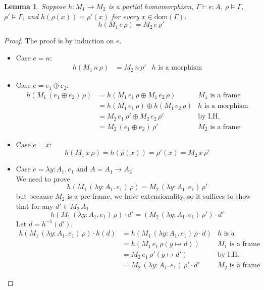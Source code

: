 \documentclass{tufte-handout}
\newcommand{\LAM}[1]{\lambda #1.\,}
\newcommand{\of}[0]{\!:\!}
\newcommand{\ext}[3]{#3(#1{\mapsto}#2)}
\newtheorem{lemma}[theorem]{Lemma}
\begin{document}
\begin{lemma}
\label{lem:homo-equal}
  Suppose $h : M_1 \to M_2$ is a partial homomorphism, $\Gamma \vdash
  e : A$, $\rho \models \Gamma$, $\rho' \models \Gamma$, and
  $h(\rho(x)) = \rho'(x)$ for every $x \in \mathrm{dom}(\Gamma)$.
  \[
    h(M_1\,e\,\rho) = M_2\,e\,\rho'
  \]
\end{lemma}
\begin{proof}
  The proof is by induction on $e$.
  \begin{itemize}
  \item Case $e=n$:\\
    \begin{align*}
    h(M_1\,n\,\rho) &= M_2\,n\,\rho' & \text{$h$ is a morphism}
    \end{align*}
  \item Case $e=e_1 \oplus e_2$:
    \begin{align*}
    h(M_1\,(e_1 \oplus e_2)\,\rho) 
    &= h(M_1\,e_1\,\rho \oplus M_1\,e_2\,\rho) & \text{$M_1$ is a frame} \\
    &= h(M_1\,e_1\,\rho) \oplus h(M_1\,e_2\,\rho) & \text{$h$ is a morphism}\\
    &= M_2\,e_1\,\rho' \oplus M_2\,e_2\,\rho' & \text{by I.H.}\\
    &= M_2\,(e_1 \oplus e_2)\,\rho' & \text{$M_2$ is a frame}
    \end{align*}

  \item Case $e=x$:
    \[
      h(M_1\,x\,\rho) = h(\rho(x)) = \rho'(x) = M_2\,x\,\rho'
    \]
  \item Case $e=\LAM{y \of A_1} e_1$ and $A = A_1 \to A_2$: \\
    We need to prove
    \[
    h(M_1\,(\LAM{y \of A_1} e_1)\,\rho) = M_2\,(\LAM{y \of A_1} e_1)\,\rho'
    \]
    but because $M_2$ is a pre-frame, we have extensionality, so it suffices to
    show that for any $d' \in M_2\,A_1$
    \[
    h(M_1\,(\LAM{y \of A_1} e_1)\,\rho) \cdot d' = (M_2\,(\LAM{y \of A_1} e_1)\,\rho') \cdot d'
    \]
    Let $d = h^{-1}(d')$. 
    \begin{align*}
      h(M_1\,(\LAM{y \of A_1} e_1)\,\rho) \cdot h(d)
      &= h(M_1\,(\LAM{y \of A_1} e_1)\,\rho \cdot d) & \text{$h$ is a morphism}\\
      &= h(M_1\,e_1\,\ext{y}{d}{\rho}) & \text{$M_1$ is a frame}\\
      &= M_2\,e_1\,\ext{y}{d'}{\rho'} & \text{by I.H.} \\
      &= M_2\,(\LAM{y \of A_1} e_1)\,\rho' \cdot d' & \text{$M_2$ is a frame}
    \end{align*}
    

\end{itemize}
\end{proof}
\end{document}
